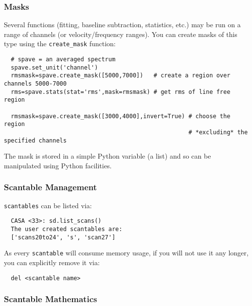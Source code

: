 \subsubsection{Masks}
\label{subsubsection:sd.asap.scantable.masks}

Several functions (fitting, baseline subtraction, statistics, etc.) may
be run on a range of channels (or velocity/frequency ranges). You can
create masks of this type using the {\tt create\_mask} function:

\small
\begin{verbatim}
  # spave = an averaged spectrum
  spave.set_unit('channel')
  rmsmask=spave.create_mask([5000,7000])   # create a region over channels 5000-7000
  rms=spave.stats(stat='rms',mask=rmsmask) # get rms of line free region

  rmsmask=spave.create_mask([3000,4000],invert=True) # choose the region 
                                                     # *excluding* the specified channels
\end{verbatim}
\normalsize

The mask is stored in a simple Python variable (a list) and so can be
manipulated using Python facilities. 

\subsubsection{Scantable Management}
\label{subsubsection:sd.asap.scantable.management}

{\tt scantables} can be listed via:

\small
\begin{verbatim}
  CASA <33>: sd.list_scans()
  The user created scantables are:
  ['scans20to24', 's', 'scan27']
\end{verbatim}
\normalsize

As every {\tt scantable} will consume memory usage, if you will not use it
any longer, you can explicitly remove it via:

\small
\begin{verbatim}
  del <scantable name>
\end{verbatim}
\normalsize
 
\subsubsection{Scantable Mathematics}
\label{subsubsection:sd.asap.scantable.scanmath}

